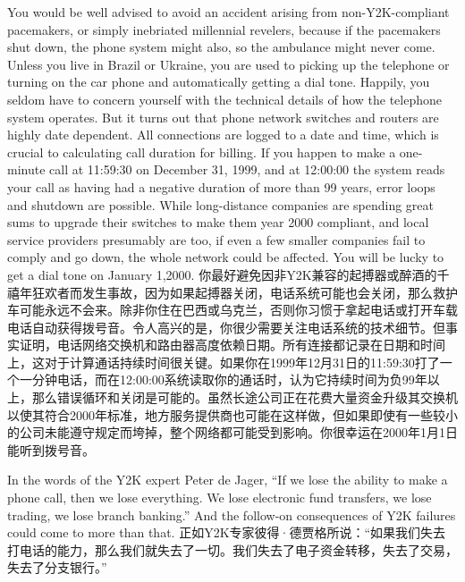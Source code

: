 \begin{Parallel}{97mm}{45mm}
  \ParallelLText
  {You would be well advised to avoid an accident arising from non-Y2K-compliant pacemakers, or simply inebriated millennial revelers, because if the pacemakers shut down, the phone system might also, so the ambulance might never come. Unless you live in Brazil or Ukraine, you are used to picking up the telephone or turning on the car phone and automatically getting a dial tone. Happily, you seldom have to concern yourself with the technical details of how the telephone system operates. But it turns out that phone network switches and routers are highly date dependent. All connections are logged to a date and time, which is crucial to calculating call duration for billing. If you happen to make a one-minute call at 11:59:30 on December 31, 1999, and at 12:00:00 the system reads your call as having had a negative duration of more than 99 years, error loops and shutdown are possible. While long-distance companies are spending great sums to upgrade their switches to make them year 2000 compliant, and local service providers presumably are too, if even a few smaller companies fail to comply and go down, the whole network could be affected. You will be lucky to get a dial tone on January 1,2000.   }  
  \ParallelRText
  {\small 你最好避免因非Y2K兼容的起搏器或醉酒的千禧年狂欢者而发生事故，因为如果起搏器关闭，电话系统可能也会关闭，那么救护车可能永远不会来。除非你住在巴西或乌克兰，否则你习惯于拿起电话或打开车载电话自动获得拨号音。令人高兴的是，你很少需要关注电话系统的技术细节。但事实证明，电话网络交换机和路由器高度依赖日期。所有连接都记录在日期和时间上，这对于计算通话持续时间很关键。如果你在1999年12月31日的11:59:30打了一个一分钟电话，而在12:00:00系统读取你的通话时，认为它持续时间为负99年以上，那么错误循环和关闭是可能的。虽然长途公司正在花费大量资金升级其交换机以使其符合2000年标准，地方服务提供商也可能在这样做，但如果即使有一些较小的公司未能遵守规定而垮掉，整个网络都可能受到影响。你很幸运在2000年1月1日能听到拨号音。}
  \ParallelPar


  \ParallelLText
  {In the words of the Y2K expert Peter de Jager, “If we lose the ability to make a phone call, then we lose everything. We lose electronic fund transfers, we lose trading, we lose branch banking.” And the follow-on consequences of Y2K failures could come to more than that.}  
  \ParallelRText
  {\small 正如Y2K专家彼得·德贾格所说：“如果我们失去打电话的能力，那么我们就失去了一切。我们失去了电子资金转移，失去了交易，失去了分支银行。”}
  \ParallelPar


\end{Parallel}
